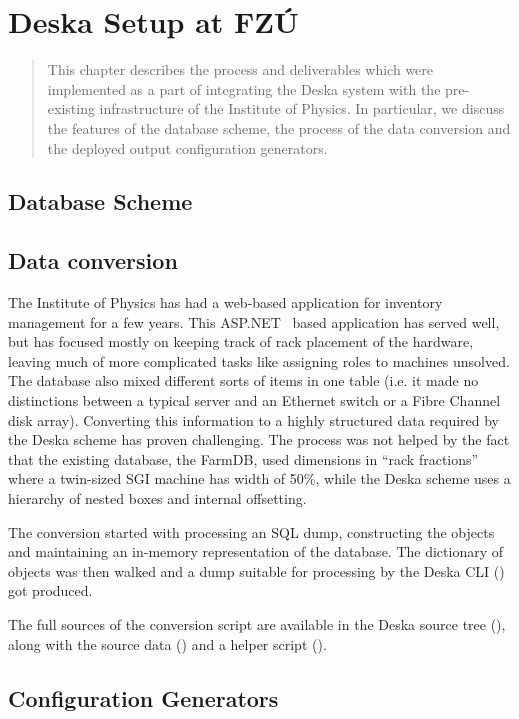 \documentclass[deska]{subfiles}
\begin{document}
\chapter{Deska Setup at FZÚ}
\label{sec:fzu-setup}

\begin{abstract}
This chapter describes the process and deliverables which were implemented as a part of integrating the Deska system
with the pre-existing infrastructure of the Institute of Physics.  In particular, we discuss the features of the
database scheme, the process of the data conversion and the deployed output configuration generators.
\end{abstract}

\section{Database Scheme}
\label{sec:fzu-scheme}

\section{Data conversion}
\label{sec:fzu-farmdb}

The Institute of Physics has had a web-based application for inventory management for a few years.  This
ASP.NET~\cite{asp.net} based application has served well, but has focused mostly on keeping track of rack placement of
the hardware, leaving much of more complicated tasks like assigning roles to machines unsolved.  The database also mixed
different sorts of items in one table (i.e. it made no distinctions between a typical server and an Ethernet switch or a
Fibre Channel disk array).  Converting this information to a highly structured data required by the Deska scheme has
proven challenging.  The process was not helped by the fact that the existing database, the FarmDB, used dimensions in
``rack fractions'' where a twin-sized SGI machine has width of 50\%, while the Deska scheme uses a hierarchy of nested
boxes and internal offsetting.

The conversion started with processing an SQL dump, constructing the objects and maintaining an in-memory representation
of the database.  The dictionary of objects was then walked and a dump suitable for processing by the Deska CLI
() got produced.

The full sources of the conversion script are available in the Deska source tree (), along with
the source data () and a helper script ().

\section{Configuration Generators}
\label{sec:fzu-cfggen}
\end{document}

